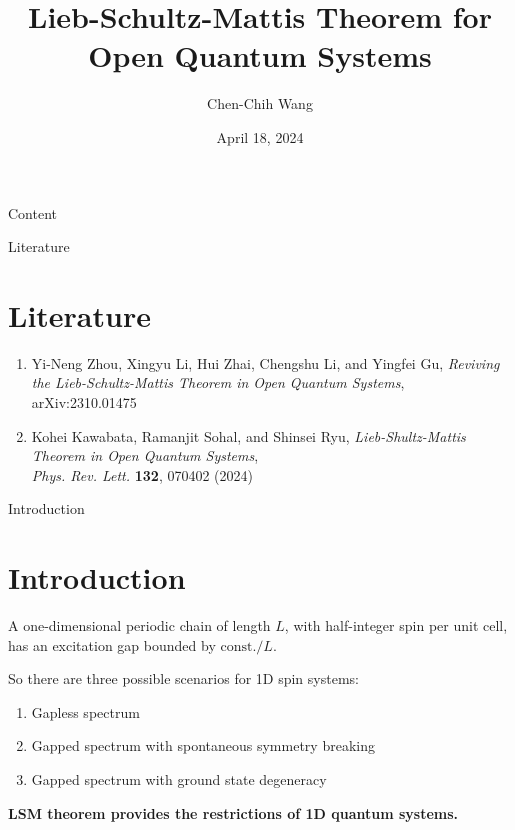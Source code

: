 \documentclass[professionalfont]{beamer}
\title{\textbf{Lieb-Schultz-Mattis Theorem for Open Quantum Systems}}
\author{Chen-Chih Wang}
\institute{Department of Physics, National Tsing Hua University}
\date{April 18, 2024}
\theoremstyle{definition}
\newcommand{\mrm}[1]{\mathrm{#1}}
\begin{document}
\begin{frame}
    \titlepage
\end{frame}

\begin{frame}{Content}
   \tableofcontents
\end{frame}

\begin{frame}{Literature}
\section{Literature}
    \begin{enumerate}
        \item Yi-Neng Zhou, Xingyu Li, Hui Zhai, Chengshu Li, and Yingfei Gu, \textit{Reviving the Lieb-Schultz-Mattis Theorem in Open Quantum Systems}, arXiv:2310.01475
        \item Kohei Kawabata, Ramanjit Sohal, and Shinsei Ryu, \emph{Lieb-Shultz-Mattis Theorem in Open Quantum Systems}, \\ \emph{Phys. Rev. Lett.} \textbf{132}, 070402 (2024)
    \end{enumerate}
\end{frame}
\begin{frame}{Introduction}
\section{Introduction}
\begin{theorem}
     A one-dimensional periodic chain of length $L$, with half-integer spin per unit cell, has an excitation gap bounded by $\mrm{const.}/L$.
\end{theorem}
So there are three possible scenarios for 1D spin systems:
\begin{enumerate}
    \item Gapless spectrum
    \item Gapped spectrum with spontaneous symmetry breaking
    \item Gapped spectrum with ground state degeneracy 
\end{enumerate}
\textbf{LSM theorem provides the restrictions of 1D quantum systems. }
\end{frame}
\end{document}
